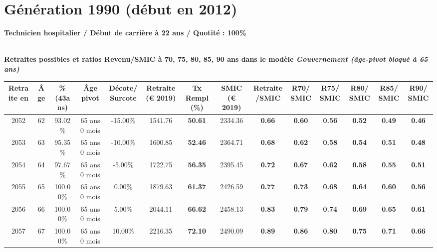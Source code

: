 \newpage 
 
\section{Génération 1990 (début en 2012)\label{TechHosp_100_1990_22_0}} 
 
{\bf \noindent Technicien hospitalier / Début de carrière à 22 ans / Quotité : 100\%}  ~ 

 ~\\{\bf \noindent Retraites possibles et ratios Revenu/SMIC à 70, 75, 80, 85, 90 ans dans le modèle \emph{Gouvernement (âge-pivot bloqué à 65 ans)}}  
 
\begin{adjustbox}{max width=\textwidth} 
\begin{tabular}[htb]{|c|c||c|c|c||c|c||c|c||c|c|c|c|c|} 
\hline 
 Retraite en &  Âge &  \%(43ans) &  Âge pivot &  Décote/Surcote &  Retraite (\euro{} 2019) &  Tx Rempl(\%) &  SMIC (\euro{} 2019) &  Retraite/SMIC &  R70/SMIC &  R75/SMIC &  R80/SMIC &  R85/SMIC &  R90/SMIC \\ 
\hline \hline 
 2052 &  62 &  93.02\% &  65 ans 0 mois &  -15.00\% &  1541.76 &  {\bf 50.61} &  2334.36 &  {\bf {\color{red} 0.66}} &  {\bf {\color{red} 0.60}} &  {\bf {\color{red} 0.56}} &  {\bf {\color{red} 0.52}} &  {\bf {\color{red} 0.49}} &  {\bf {\color{red} 0.46}} \\ 
\hline 
 2053 &  63 &  95.35\% &  65 ans 0 mois &  -10.00\% &  1600.85 &  {\bf 52.46} &  2364.71 &  {\bf {\color{red} 0.68}} &  {\bf {\color{red} 0.62}} &  {\bf {\color{red} 0.58}} &  {\bf {\color{red} 0.54}} &  {\bf {\color{red} 0.51}} &  {\bf {\color{red} 0.48}} \\ 
\hline 
 2054 &  64 &  97.67\% &  65 ans 0 mois &  -5.00\% &  1722.75 &  {\bf 56.35} &  2395.45 &  {\bf {\color{red} 0.72}} &  {\bf {\color{red} 0.67}} &  {\bf {\color{red} 0.62}} &  {\bf {\color{red} 0.58}} &  {\bf {\color{red} 0.55}} &  {\bf {\color{red} 0.51}} \\ 
\hline 
 2055 &  65 &  100.00\% &  65 ans 0 mois &  0.00\% &  1879.63 &  {\bf 61.37} &  2426.59 &  {\bf {\color{red} 0.77}} &  {\bf {\color{red} 0.73}} &  {\bf {\color{red} 0.68}} &  {\bf {\color{red} 0.64}} &  {\bf {\color{red} 0.60}} &  {\bf {\color{red} 0.56}} \\ 
\hline 
 2056 &  66 &  100.00\% &  65 ans 0 mois &  5.00\% &  2044.11 &  {\bf 66.62} &  2458.13 &  {\bf {\color{red} 0.83}} &  {\bf {\color{red} 0.79}} &  {\bf {\color{red} 0.74}} &  {\bf {\color{red} 0.69}} &  {\bf {\color{red} 0.65}} &  {\bf {\color{red} 0.61}} \\ 
\hline 
 2057 &  67 &  100.00\% &  65 ans 0 mois &  10.00\% &  2216.35 &  {\bf 72.10} &  2490.09 &  {\bf {\color{red} 0.89}} &  {\bf {\color{red} 0.86}} &  {\bf {\color{red} 0.80}} &  {\bf {\color{red} 0.75}} &  {\bf {\color{red} 0.71}} &  {\bf {\color{red} 0.66}} \\ 
\hline 
\hline 
\end{tabular} 
\end{adjustbox} 
 
